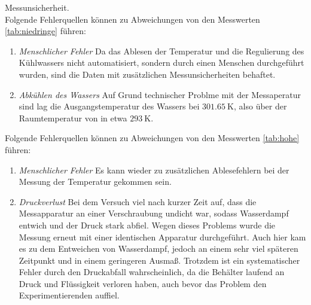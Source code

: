Messunsicherheit.\\
Folgende Fehlerquellen können zu Abweichungen von den Messwerten \ref{tab:niedringe} führen:
\begin{enumerate}
  \item \textit{Menschlicher Fehler}
    Da das Ablesen der Temperatur und die Regulierung des Kühlwassers nicht automatisiert, sondern durch
    einen Menschen durchgeführt wurden, sind die Daten mit zusätzlichen Messunsicherheiten behaftet.
  \item \textit{Abkühlen des Wassers}
    Auf Grund technischer Problme mit der Messaperatur sind lag die Ausgangstemperatur des Wassers
    bei $\SI{301.65}{\kelvin}$, also über der Raumtemperatur von in etwa $\SI{293}{\kelvin}$.
\end{enumerate}
Folgende Fehlerquellen können zu Abweichungen von den Messwerten \ref{tab:hohe} führen:
\begin{enumerate}
  \item \textit{Menschlicher Fehler}
    Es kann wieder zu zusätzlichen Ablesefehlern bei der Messung der Temperatur gekommen sein.
  \item \textit{Druckverlust}
    Bei dem Versuch viel nach kurzer Zeit auf, dass die Messapparatur an einer Verschraubung undicht war,
    sodass Wasserdampf entwich und der Druck stark abfiel. Wegen dieses Problems wurde die Messung
    erneut mit einer identischen Apparatur durchgeführt. Auch hier kam es zu dem Entweichen von Wasserdampf,
    jedoch an einem sehr viel späteren Zeitpunkt und in einem geringeren Ausmaß. Trotzdem ist ein systematischer
    Fehler durch den Druckabfall wahrscheinlich, da die Behälter laufend an Druck und Flüssigkeit verloren haben, auch
    bevor das Problem den Experimentierenden auffiel.
\end{enumerate}


